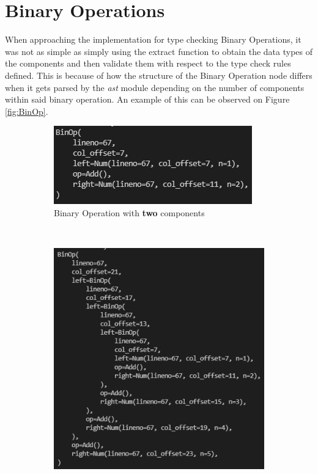 \documentclass{l4proj}
\begin{document}
\section{Binary Operations}
When approaching the implementation for type checking Binary Operations, it was not as simple as simply using the extract function to obtain the data types of the components and then validate them with respect to the type check rules defined. This is because of how the structure of the Binary Operation node differs when it gets parsed by the \textit{ast} module depending on the number of components within said binary operation. An example of this can be observed on Figure \ref{fig:BinOp}.

\begin{figure}[h]
    \centering
    \begin{subfigure}[b]{0.45\textwidth}
        \includegraphics[width=\textwidth]{images/BinOp1.png}
        \caption{Binary Operation with \textbf{two} components}
        \label{fig:Bin1}
    \end{subfigure}
    ~ %
    \begin{subfigure}[b]{0.45\textwidth}
        \includegraphics[width=\textwidth]{images/BinOp2.png}

\end{subfigure}
\end{figure}
\end{document}
